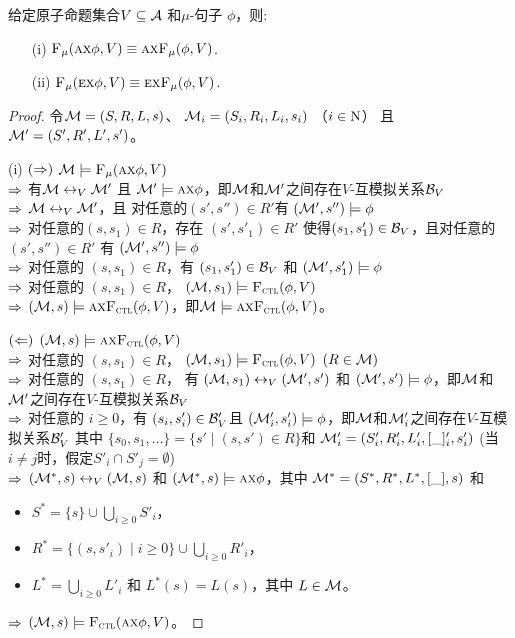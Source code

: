 \begin{proposition}[同质性]\label{chapter06:pro:mu:forget:2}
	给定原子命题集合$V\subseteq\cal A$ 和$\mu$-句子 $\phi$，则: %
	\begin{itemize}
		\item[(i)] ${\textsc{F}_{\textsc{$\mu$}}}(\textsc{a}\textsc{x}\phi,V)\equiv \textsc{a}\textsc{x} {\textsc{F}_{\textsc{$\mu$}}}(\phi,V)$.
		\item[(ii)] ${\textsc{F}_{\textsc{$\mu$}}}(\textsc{e}\textsc{x}\phi,V)\equiv\textsc{e}\textsc{x} {\textsc{F}_{\textsc{$\mu$}}}(\phi,V)$.
	\end{itemize}
\end{proposition}
\begin{proof}
	令${\cal M}=(S,R, L, s)$、 ${\cal M}_i = (S_i, R_i, L_i, s_i)$ （$i \in \textmd{N}$） 且 ${\cal M}'=(S', R', L', s')$。
	
	(i) $(\Rightarrow)$ ${\cal M}\models{\textsc{F}_{\textsc{$\mu$}}}(\textsc{a}\textsc{x}\phi,V)$\\
	$\Rightarrow$ 有${\cal M}\leftrightarrow_V{\cal M}'$ 且 ${\cal M}'\models \textsc{a}\textsc{x}\phi$，即${\cal M}$和${\cal M}'$之间存在$V$-互模拟关系${\cal B}_V$\\
	$\Rightarrow$  ${\cal M}\leftrightarrow_V {\cal M}'$，且 对任意的$(s',s'')\in R'$有 $({\cal M}', s'')\models \phi$  \\
	$\Rightarrow$ 对任意的$(s,s_1)\in R$，存在 $(s',s'_1)\in R'$ 使得$(s_1,s_1')\in {\cal B}_V$，且对任意的 $(s',s'')\in R'$ 有
	$({\cal M}',s'')\models \phi$\\
	$\Rightarrow$ 对任意的 $(s,s_1)\in R$，有 $(s_1,s_1')\in {\cal B}_V$ 和 $({\cal M}',s'_1)\models\phi$\\
	$\Rightarrow$ 对任意的 $(s,s_1)\in R$， $({\cal M},s_1)\models{\textsc{F}_{\textsc{ctl}}}(\phi,V)$\\
	$\Rightarrow$ $({\cal M},s)\models\textsc{a}\textsc{x}{\textsc{F}_{\textsc{ctl}}}(\phi,V)$，即${\cal M} \models\textsc{a}\textsc{x}{\textsc{F}_{\textsc{ctl}}}(\phi,V)$。
	
	$(\Leftarrow)$ $({\cal M},s)\models\textsc{a}\textsc{x}{\textsc{F}_{\textsc{ctl}}}(\phi,V)$\\
	$\Rightarrow$ 对任意的 $(s,s_1)\in R$， $({\cal M},s_1)\models{\textsc{F}_{\textsc{ctl}}}(\phi,V)$ $(R\in {\cal M})$\\
	$\Rightarrow$ 对任意的 $(s,s_1)\in R$， 有 $({\cal M},s_1)\leftrightarrow_V({\cal M}',s')$ 和 $({\cal M}',s')\models\phi$，即${\cal M}$和${\cal M}'$之间存在$V$-互模拟关系${\cal B}_V$\\
	$\Rightarrow$ 对任意的 $i\ge 0$，有 $(s_i,s_i') \in {\cal B}_V'$且 $({\cal M}'_i,s'_i)\models\phi$，即${\cal M}$和${\cal M}_i'$之间存在$V$-互模拟关系${\cal B}_V'$
	其中 $\{s_0,s_1,\ldots\}=\{s'\mid (s,s')\in R\}$和 ${\cal M}'_i=(S'_i,R'_i,L'_i,[\_]'_i,s'_i)$ (当$i\neq j$时，假定$S'_i\cap S'_j=\emptyset$)\\
	$\Rightarrow$ $({\cal M}^*,s)\leftrightarrow_V({\cal M},s)$ 和 $({\cal M}^*,s)\models\textsc{a}\textsc{x}\phi$，其中
	${\cal M}^*=(S^*,R^*,L^*,[\_], s)$ 和
	\begin{itemize}
		\item $S^*=\{s\}\cup\bigcup_{i\ge 0}S'_i$，
		\item $R^*=\{(s,s'_i)\mid i\ge 0\}\cup \bigcup_{i\ge 0} R'_i$，
		\item $L^*=\bigcup_{i\ge 0}L'_i$ 和 $L^*(s)=L(s)$，其中 $L\in{\cal M}$。
	\end{itemize}
	$\Rightarrow$ $({\cal M},s)\models {\textsc{F}_{\textsc{ctl}}}(\textsc{a}\textsc{x}\phi,V)$。
	

\end{proof}
